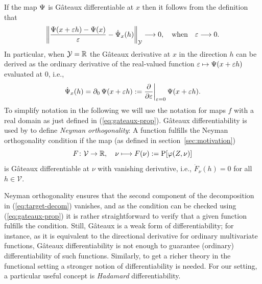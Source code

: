 \documentclass[a4,danish]{article}
\begin{document}
If the map $\operatorname{\Psi}$ is Gâteaux differentiable at $x$ then it follows from the definition that
\begin{equation}
  \label{eq:1}
    \left\Vert
      \frac{\operatorname{\Psi}(x + \varepsilon h) - \operatorname{\Psi}(x)}{\varepsilon} - \dot{\operatorname{\Psi}}_x(h)
    \right\Vert_{\mathcal{Y}} \longrightarrow 0,
    \quad \text{when} \quad \varepsilon \longrightarrow 0.
\end{equation}
In particular, when $\mathcal{Y} = \mathbb{R}$ the Gâteaux derivative at $x$ in the direction $h$ can be
derived as the ordinary derivative of the real-valued function
$\varepsilon \mapsto \operatorname{\Psi}(x + \varepsilon h)$ evaluated at 0, i.e.,
\begin{equation}
  \label{eq:gateaux-prop}
  \dot{\operatorname{\Psi}}_x(h) = \partial_0 \operatorname{\Psi}(x + \varepsilon h)
  := \frac{\partial}{\partial \varepsilon} \bigg \vert_{\varepsilon=0} \operatorname{\Psi}(x + \varepsilon h).
\end{equation}
To simplify notation in the following we will use the notation
 for maps $f$ with a real domain
as just defined in (\ref{eq:gateaux-prop}). Gâteaux differentiability
is used by \cite{chernozhukov2018double} to define \textit{Neyman
  orthogonality}: A function  fulfills the Neyman orthogonality
condition  if the map (as
defined in section~\ref{sec:motivation})
\begin{equation*}
  F \colon \mathcal{V} \rightarrow \mathbb{R}, \quad \nu \longmapsto F(\nu) :=\mathrm{{P}}[\varphi(Z, \nu)]
\end{equation*}
is Gâteaux differentiable at $\nu$ with vanishing derivative, i.e., $\dot{F}_{\nu}(h) = 0$ for all
$h \in \mathcal{V}$.

Neyman orthogonality ensures that the second component of the decomposition in
(\ref{eq:target-decom}) vanishes, and as the condition can be checked using (\ref{eq:gateaux-prop})
it is rather straightforward to verify that a given function fulfills the condition. Still, Gâteaux
is a weak form of differentiability; for instance, as it is equivalent to the directional derivative
for ordinary multivariate functions, Gâteaux differentiability is not enough to guarantee (ordinary)
differentiability of such functions. Similarly, to get a richer theory in the functional setting a
stronger notion of differentiability is needed. For our setting, a particular useful concept is
\textit{Hadamard} differentiability.
\end{document}
